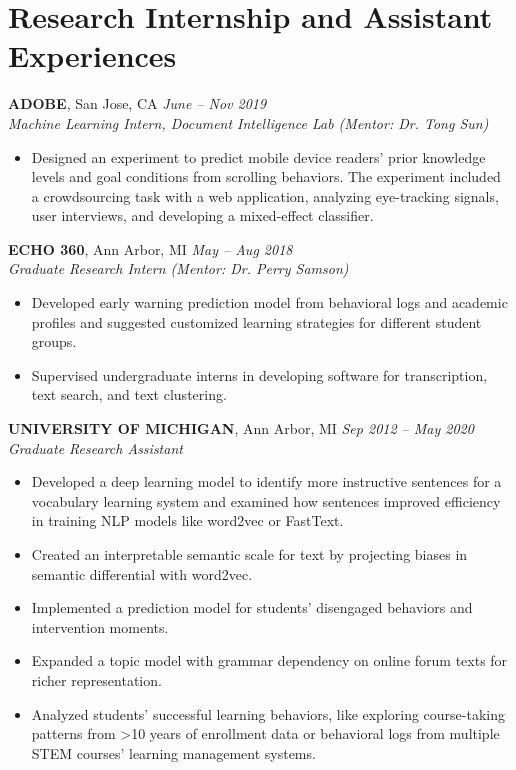 \documentclass[11pt,a4paper]{article}
\begin{document}
\section*{Research Internship and Assistant Experiences}

\textbf{ADOBE}, San Jose, CA \hfill \textit{June -- Nov 2019} \\
\textit{Machine Learning Intern, Document Intelligence Lab (Mentor: Dr. Tong Sun)}
\begin{itemize}
    \item Designed an experiment to predict mobile device readers' prior knowledge levels and goal conditions from scrolling behaviors. The experiment included a crowdsourcing task with a web application, analyzing eye-tracking signals, user interviews, and developing a mixed-effect classifier.
\end{itemize}

\vspace{1ex}

\textbf{ECHO 360}, Ann Arbor, MI \hfill \textit{May -- Aug 2018} \\
\textit{Graduate Research Intern (Mentor: Dr. Perry Samson)}
\begin{itemize}
    \item Developed early warning prediction model from behavioral logs and academic profiles and suggested customized learning strategies for different student groups.
    \item Supervised undergraduate interns in developing software for transcription, text search, and text clustering.
\end{itemize}

\vspace{1ex}

\textbf{UNIVERSITY OF MICHIGAN}, Ann Arbor, MI \hfill \textit{Sep 2012 -- May 2020} \\
\textit{Graduate Research Assistant}
\begin{itemize}
    \item Developed a deep learning model to identify more instructive sentences for a vocabulary learning system and examined how sentences improved efficiency in training NLP models like word2vec or FastText.
    \item Created an interpretable semantic scale for text by projecting biases in semantic differential with word2vec.
    \item Implemented a prediction model for students' disengaged behaviors and intervention moments.
    \item Expanded a topic model with grammar dependency on online forum texts for richer representation.
    \item Analyzed students' successful learning behaviors, like exploring course-taking patterns from >10 years of enrollment data or behavioral logs from multiple STEM courses' learning management systems.
\end{itemize}
\end{document}
